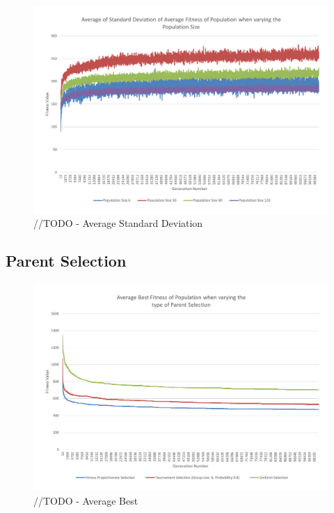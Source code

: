 \begin{figure}
	\centerline{\includegraphics[width=\paperwidth]{figures/CircleTests/CircleTestsPopulationAverageStandardDeviation.pdf}}
	\caption{//TODO - Average Standard Deviation}
\end{figure}

\subsection{Parent Selection} %
\label{sub:parent_selection}
\begin{figure}
	\centerline{\includegraphics[width=\paperwidth]{figures/CircleTests/CircleTestParentSelectionAverageBest.pdf}}
	\caption{//TODO - Average Best}
\end{figure}

